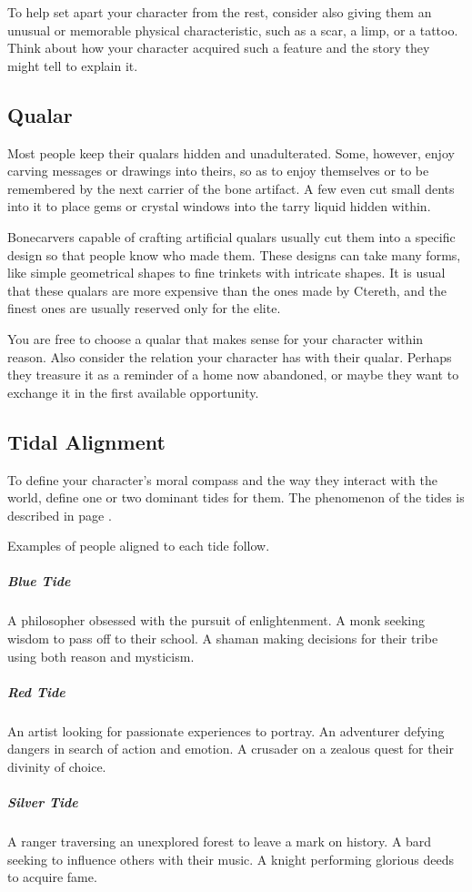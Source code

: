 \begin{linenumbers}
To help set apart your character from the rest, consider also giving them an unusual or memorable physical characteristic, such as a scar, a limp, or a tattoo.
Think about how your character acquired such a feature and the story they might tell to explain it.

\subsection*{Qualar}
Most people keep their qualars hidden and unadulterated.
Some, however, enjoy carving messages or drawings into theirs, so as to enjoy themselves or to be remembered by the next carrier of the bone artifact.
A few even cut small dents into it to place gems or crystal windows into the tarry liquid hidden within.

Bonecarvers capable of crafting artificial qualars usually cut them into a specific design so that people know who made them.
These designs can take many forms, like simple geometrical shapes to fine trinkets with intricate shapes.
It is usual that these qualars are more expensive than the ones made by Ctereth, and the finest ones are usually reserved only for the elite.

You are free to choose a qualar that makes sense for your character within reason.
Also consider the relation your character has with their qualar.
Perhaps they treasure it as a reminder of a home now abandoned, or maybe they want to exchange it in the first available opportunity.

\subsection*{Tidal Alignment}
To define your character's moral compass and the way they interact with the world, define one or two dominant tides for them.
The phenomenon of the tides is described in page \pageref{ssec::tides}.

Examples of people aligned to each tide follow.

\subparagraph{Blue Tide} A philosopher obsessed with the pursuit of enlightenment.
A monk seeking wisdom to pass off to their school.
A shaman making decisions for their tribe using both reason and mysticism.

\subparagraph{Red Tide} An artist looking for passionate experiences to portray.
An adventurer defying dangers in search of action and emotion.
A crusader on a zealous quest for their divinity of choice.

\subparagraph{Silver Tide} A ranger traversing an unexplored forest to leave a mark on history.
A bard seeking to influence others with their music.
A knight performing glorious deeds to acquire fame.


\end{linenumbers}
